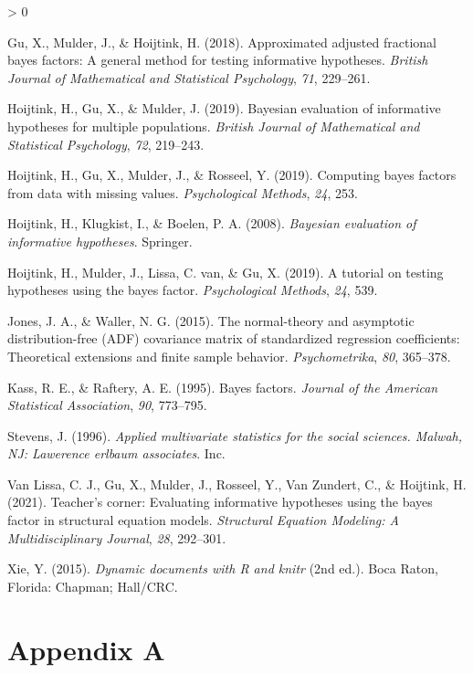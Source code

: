 \documentclass[
]{book}
\newlength{\cslhangindent}
\newenvironment{CSLReferences}[2] %
 {%
  \setlength{\parindent}{0pt}
  \ifodd #1 \everypar{\setlength{\hangindent}{\cslhangindent}}\ignorespaces\fi
  \ifnum #2 > 0
  \setlength{\parskip}{#2\baselineskip}
  \fi
 }%
 {}
\begin{document}
\hypertarget{refs}{}
\begin{CSLReferences}{1}{0}
\leavevmode\hypertarget{ref-gu2018approximated}{}%
Gu, X., Mulder, J., \& Hoijtink, H. (2018). Approximated adjusted fractional bayes factors: A general method for testing informative hypotheses. \emph{British Journal of Mathematical and Statistical Psychology}, \emph{71}, 229--261.

\leavevmode\hypertarget{ref-hoijtink2019bayesian}{}%
Hoijtink, H., Gu, X., \& Mulder, J. (2019). Bayesian evaluation of informative hypotheses for multiple populations. \emph{British Journal of Mathematical and Statistical Psychology}, \emph{72}, 219--243.

\leavevmode\hypertarget{ref-hoijtink2019computing}{}%
Hoijtink, H., Gu, X., Mulder, J., \& Rosseel, Y. (2019). Computing bayes factors from data with missing values. \emph{Psychological Methods}, \emph{24}, 253.

\leavevmode\hypertarget{ref-hoijtink2008bayesian}{}%
Hoijtink, H., Klugkist, I., \& Boelen, P. A. (2008). \emph{Bayesian evaluation of informative hypotheses}. Springer.

\leavevmode\hypertarget{ref-hoijtink2019tutorial}{}%
Hoijtink, H., Mulder, J., Lissa, C. van, \& Gu, X. (2019). A tutorial on testing hypotheses using the bayes factor. \emph{Psychological Methods}, \emph{24}, 539.

\leavevmode\hypertarget{ref-jones2015normal}{}%
Jones, J. A., \& Waller, N. G. (2015). The normal-theory and asymptotic distribution-free (ADF) covariance matrix of standardized regression coefficients: Theoretical extensions and finite sample behavior. \emph{Psychometrika}, \emph{80}, 365--378.

\leavevmode\hypertarget{ref-kass1995bayes}{}%
Kass, R. E., \& Raftery, A. E. (1995). Bayes factors. \emph{Journal of the American Statistical Association}, \emph{90}, 773--795.

\leavevmode\hypertarget{ref-stevens1996applied}{}%
Stevens, J. (1996). \emph{Applied multivariate statistics for the social sciences. Malwah, NJ: Lawerence erlbaum associates}. Inc.

\leavevmode\hypertarget{ref-van2021teacher}{}%
Van Lissa, C. J., Gu, X., Mulder, J., Rosseel, Y., Van Zundert, C., \& Hoijtink, H. (2021). Teacher's corner: Evaluating informative hypotheses using the bayes factor in structural equation models. \emph{Structural Equation Modeling: A Multidisciplinary Journal}, \emph{28}, 292--301.

\leavevmode\hypertarget{ref-xie2015}{}%
Xie, Y. (2015). \emph{Dynamic documents with {R} and knitr} (2nd ed.). Boca Raton, Florida: Chapman; Hall/CRC.

\end{CSLReferences}

\hypertarget{appendix-appendix}{%
\appendix}


\hypertarget{appendix-a}{%
\chapter*{Appendix A}\label{appendix-a}}
\end{document}
